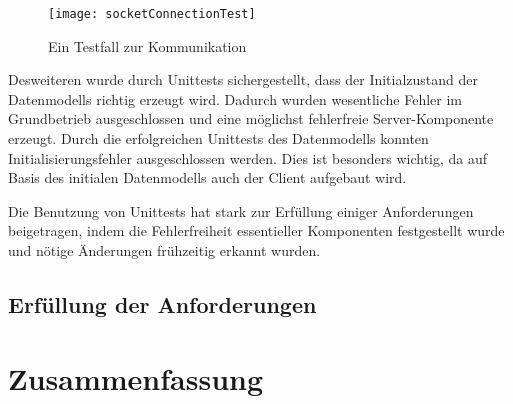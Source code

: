 \begin{figure}[htp]
	\centering
	\captionsetup{justification=centering}
	\texttt{[image: socketConnectionTest]}
	\caption[Socket-Test]{Ein Testfall zur Kommunikation}
	\label{fig:ComTest}
\end{figure}

\noindent Desweiteren wurde durch Unittests sichergestellt, dass der Initialzustand der Datenmodells richtig erzeugt wird. Dadurch wurden wesentliche Fehler im Grundbetrieb ausgeschlossen und eine möglichst fehlerfreie Server-Komponente erzeugt. Durch die erfolgreichen Unittests des Datenmodells konnten Initialisierungsfehler ausgeschlossen werden. Dies ist besonders wichtig, da auf Basis des initialen Datenmodells auch der Client aufgebaut wird.

Die Benutzung von Unittests hat stark zur Erfüllung einiger Anforderungen beigetragen, indem die Fehlerfreiheit essentieller Komponenten festgestellt wurde und nötige Änderungen frühzeitig erkannt wurden.

\subsection{Erfüllung der Anforderungen}
\label{subsec:erfullung_anforderungen}


\section{Zusammenfassung}
\label{sec:Fazit}